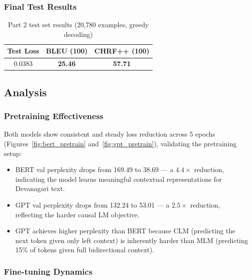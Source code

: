 \documentclass[12pt,a4paper]{article}
\begin{document}
\subsubsection{Final Test Results}

\begin{table}[H]
\centering
\caption{Part 2 test set results (20,780 examples, greedy decoding)}
\label{tab:part2_results}
\begin{tabular}{ccc}
\toprule
\textbf{Test Loss} & \textbf{BLEU (100)} & \textbf{CHRF++ (100)} \\
\midrule
0.0383 & \textbf{25.46} & \textbf{57.71} \\
\bottomrule
\end{tabular}
\end{table}

\subsection{Analysis}

\subsubsection{Pretraining Effectiveness}

Both models show consistent and steady loss reduction across 5 epochs (Figures~\ref{fig:bert_pretrain} and~\ref{fig:gpt_pretrain}), validating the pretraining setup:
\begin{itemize}
    \item BERT val perplexity drops from 169.49 to 38.69 — a $4.4\times$ reduction, indicating the model learns meaningful contextual representations for Devanagari text.
    \item GPT val perplexity drops from 132.24 to 53.01 — a $2.5\times$ reduction, reflecting the harder causal LM objective.
    \item GPT achieves higher perplexity than BERT because CLM (predicting the next token given only left context) is inherently harder than MLM (predicting 15\% of tokens given full bidirectional context).
\end{itemize}

\subsubsection{Fine-tuning Dynamics}
\end{document}
